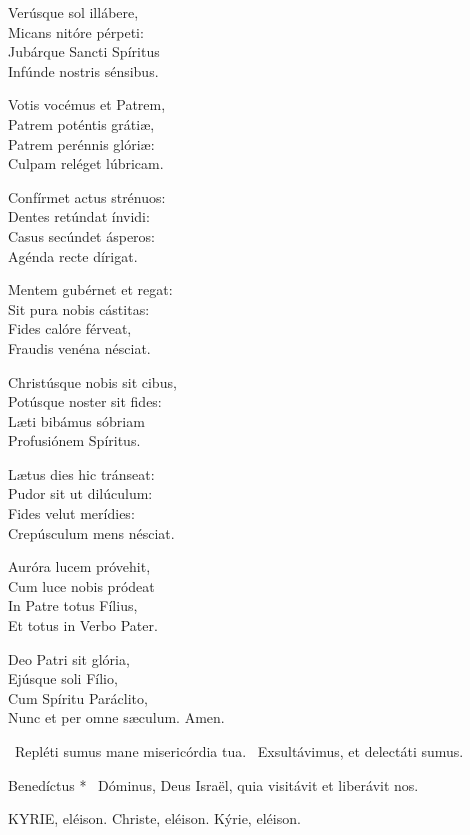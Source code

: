 Verúsque sol illábere,\\
Micans nitóre pérpeti:\\
Jubárque Sancti Spíritus\\
Infúnde nostris sénsibus.

Votis vocémus et Patrem,\\
Patrem poténtis grátiæ,\\
Patrem perénnis glóriæ:\\
Culpam reléget lúbricam.

Confírmet actus strénuos:\\
Dentes retúndat ínvidi:\\
Casus secúndet ásperos:\\
Agénda recte dírigat.

Mentem gubérnet et regat:\\
Sit pura nobis cástitas:\\
Fides calóre férveat,\\
Fraudis venéna nésciat.

Christúsque nobis sit cibus,\\
Potúsque noster sit fides:\\
Læti bibámus sóbriam\\
Profusiónem Spíritus.

Lætus dies hic tránseat:\\
Pudor sit ut dilúculum:\\
Fides velut merídies:\\
Crepúsculum mens nésciat.

Auróra lucem próvehit,\\
Cum luce nobis pródeat\\
In Patre totus Fílius,\\
Et totus in Verbo Pater.

Deo Patri sit glória,\\
Ejúsque soli Fílio,\\
Cum Spíritu Paráclito,\\
Nunc et per omne sæculum. Amen.

\V\ Repléti sumus mane misericórdia tua. \R\ Exsultávimus, et delectáti sumus.

 Benedíctus * \textdagger\ Dóminus, Deus Israël, quia visitávit et liberávit nos.


KYRIE, eléison. Christe, eléison. Kýrie, eléison.

